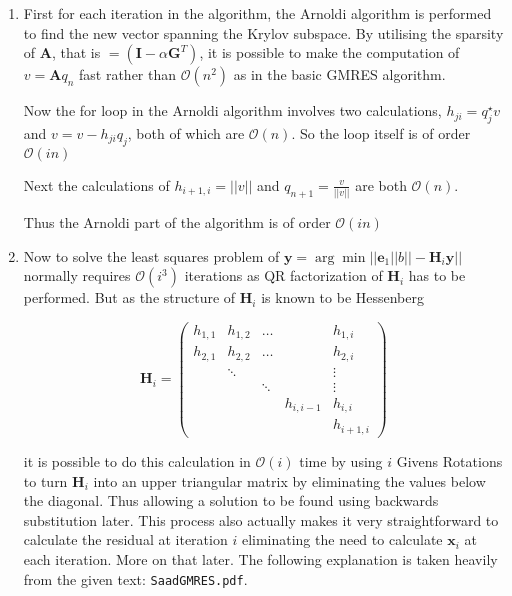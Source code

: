 \documentclass{article}
\begin{document}
\begin{enumerate}
	\begin{enumerate}
	\item First for each iteration in the algorithm, the Arnoldi algorithm is performed to find the new vector spanning the Krylov subspace. By utilising the sparsity of $\boldsymbol{A}$, that is $ = (\boldsymbol{I} - \alpha \boldsymbol{G}^T)$, it is possible to make the computation of $v = \boldsymbol{A} q_n$ fast rather than $\mathcal{O}(n^2)$ as in the basic GMRES algorithm. 
		
		Now the for loop in the Arnoldi algorithm involves two calculations, $h_{ji} = q^\star_j v$ and $v = v - h_{ji}q_j$, both of which are $\mathcal{O}(n)$. So the loop itself is of order $\mathcal{O}(in)$
		
		Next the calculations of $h_{i+1,i} = ||v||$ and $q_{n+1} = \frac{v}{||v||}$ are both $\mathcal{O}(n)$. 
		
		Thus the Arnoldi part of the algorithm is of order $\mathcal{O}(in)$
		
	\item Now to solve the least squares problem of $\boldsymbol{y} = \arg\min || \boldsymbol{e}_1||b|| - \boldsymbol{H}_i \boldsymbol{y} ||$ normally requires $\mathcal{O}(i^3)$ iterations as QR factorization of $\boldsymbol{H}_i$ has to be performed. But as the structure of $\boldsymbol{H}_i$ is known to be Hessenberg 
	
		$$ 
		\boldsymbol{H}_i = 
		\begin{pmatrix}
	    h_{1,1} & h_{1,2} & \dots && h_{1,i} \\
	    h_{2,1} & h_{2,2} & \dots && h_{2,i} \\
	    & \ddots & && \vdots \\
	    & & \ddots && \vdots \\
	    & && h_{i,i-1} & h_{i,i} \\
	    & & && h_{i+1,i}
		\end{pmatrix} 
		$$
		
		it is possible to do this calculation in $\mathcal{O}(i)$ time by using $i$ Givens Rotations to turn $\boldsymbol{H}_i$ into an upper triangular matrix by eliminating the values below the diagonal. Thus allowing a solution to be found using backwards substitution later. This process also actually makes it very straightforward to calculate the residual at iteration $i$ eliminating the need to calculate $\boldsymbol{x}_i$ at each iteration. More on that later. The following explanation is taken heavily from the given text: \texttt{SaadGMRES.pdf}.
		

\end{enumerate}
\end{enumerate}
\end{document}
